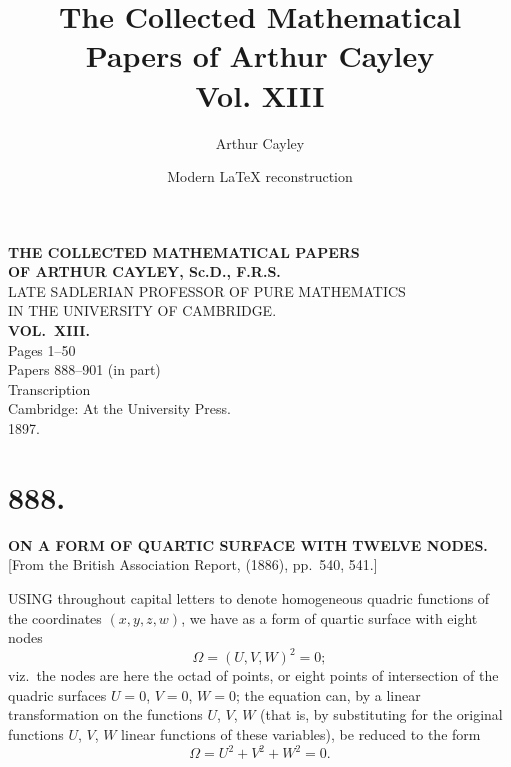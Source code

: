 \documentclass[11pt,a4paper]{book}
\title{The Collected Mathematical Papers of Arthur Cayley\\Vol. XIII}
\author{Arthur Cayley}
\date{Modern \LaTeX{} reconstruction}
\begin{document}
\maketitle


\begin{titlepage}
\centering
\vspace*{2cm}
{\LARGE\bfseries THE COLLECTED MATHEMATICAL PAPERS\\[0.5em] OF ARTHUR CAYLEY, Sc.D., F.R.S.\\[1em]}
{\Large LATE SADLERIAN PROFESSOR OF PURE MATHEMATICS\\ IN THE UNIVERSITY OF CAMBRIDGE.\\[2em]}
{\LARGE\bfseries VOL.\ XIII.\\[2em]}
{\large Pages 1--50\\[0.5em] Papers 888--901 (in part)\\[2em]}
{\large Transcription\\[3em]}
\vfill
{\large Cambridge: At the University Press.\\ 1897.\\[1em]}
\end{titlepage}

\thispagestyle{empty}
\clearpage
\setcounter{page}{1}


\section*{888.}
\begin{center}
{\large\bfseries ON A FORM OF QUARTIC SURFACE WITH TWELVE NODES.}\\[0.5em]
\small [From the British Association Report, (1886), pp.\ 540, 541.]
\end{center}

USING throughout capital letters to denote homogeneous quadric functions of the coordinates $(x, y, z, w)$, we have as a form of quartic surface with eight nodes
\[
\Omega = (U, V, W)^2 = 0;
\]
viz.\ the nodes are here the octad of points, or eight points of intersection of the quadric surfaces $U=0$, $V=0$, $W=0$; the equation can, by a linear transformation on the functions $U$, $V$, $W$ (that is, by substituting for the original functions $U$, $V$, $W$ linear functions of these variables), be reduced to the form
\[
\Omega = U^2 + V^2 + W^2 = 0.
\]
\end{document}
